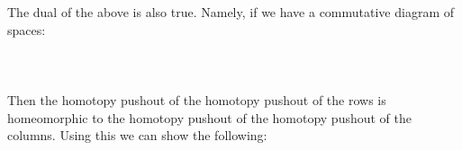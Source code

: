 \documentclass[a4paper]{article}
\begin{document}
The dual of the above is also true. Namely, if we have a commutative diagram of spaces:  
 \\~\\  \\~\\
Then the homotopy pushout of the homotopy pushout of the rows is homeomorphic to the homotopy pushout of the homotopy pushout of the columns. Using this we can show the following: 
\end{document}
